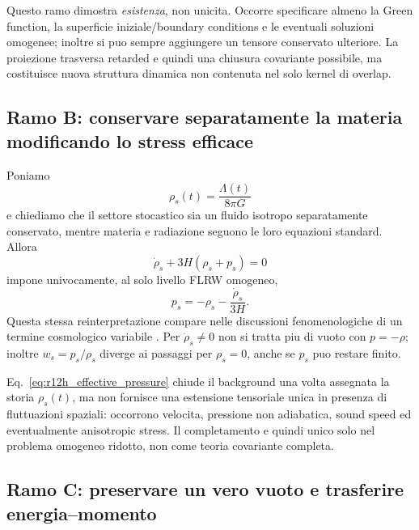 \documentclass[11pt,a4paper]{article}
\begin{document}
Questo ramo dimostra \emph{esistenza}, non unicita. Occorre specificare almeno la Green function, la superficie iniziale/boundary conditions e le eventuali soluzioni omogenee; inoltre si puo sempre aggiungere un tensore conservato ulteriore. La proiezione trasversa retarded e quindi una chiusura covariante possibile, ma costituisce nuova struttura dinamica non contenuta nel solo kernel di overlap.

\subsection{Ramo B: conservare separatamente la materia modificando lo stress efficace}

Poniamo
\begin{equation}
 \rho_s(t)=\frac{\Lambda(t)}{8\pi G}
\end{equation}
e chiediamo che il settore stocastico sia un fluido isotropo separatamente conservato, mentre materia e radiazione seguono le loro equazioni standard. Allora
\begin{equation}
 \dot\rho_s+3H(\rho_s+p_s)=0
\end{equation}
impone univocamente, al solo livello FLRW omogeneo,
\begin{equation}
 \boxed{p_s=-\rho_s-\frac{\dot\rho_s}{3H}.}
 \label{eq:r12h_effective_pressure}
\end{equation}
Questa stessa reinterpretazione compare nelle discussioni fenomenologiche di un termine cosmologico variabile \cite{AhmedSorkin2012,ZwaneAfshordiSorkin2017}. Per $\dot\rho_s\neq0$ non si tratta piu di vuoto con $p=-\rho$; inoltre $w_s=p_s/\rho_s$ diverge ai passaggi per $\rho_s=0$, anche se $p_s$ puo restare finito.

Eq.~\eqref{eq:r12h_effective_pressure} chiude il background una volta assegnata la storia $\rho_s(t)$, ma non fornisce una estensione tensoriale unica in presenza di fluttuazioni spaziali: occorrono velocita, pressione non adiabatica, sound speed ed eventualmente anisotropic stress. Il completamento e quindi unico solo nel problema omogeneo ridotto, non come teoria covariante completa.

\subsection{Ramo C: preservare un vero vuoto e trasferire energia--momento}
\end{document}
